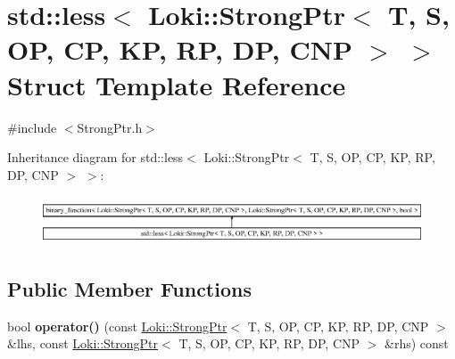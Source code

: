 \hypertarget{structstd_1_1less_3_01Loki_1_1StrongPtr_3_01T_00_01S_00_01OP_00_01CP_00_01KP_00_01RP_00_01DP_00_01CNP_01_4_01_4}{}\section{std\+:\+:less$<$ Loki\+:\+:Strong\+Ptr$<$ T, S, O\+P, C\+P, K\+P, R\+P, D\+P, C\+N\+P $>$ $>$ Struct Template Reference}
\label{structstd_1_1less_3_01Loki_1_1StrongPtr_3_01T_00_01S_00_01OP_00_01CP_00_01KP_00_01RP_00_01DP_00_01CNP_01_4_01_4}


{\ttfamily \#include $<$Strong\+Ptr.\+h$>$}

Inheritance diagram for std\+:\+:less$<$ Loki\+:\+:Strong\+Ptr$<$ T, S, O\+P, C\+P, K\+P, R\+P, D\+P, C\+N\+P $>$ $>$\+:\begin{figure}[H]
\begin{center}
\leavevmode
\includegraphics[height=1.469816cm]{structstd_1_1less_3_01Loki_1_1StrongPtr_3_01T_00_01S_00_01OP_00_01CP_00_01KP_00_01RP_00_01DP_00_01CNP_01_4_01_4}
\end{center}
\end{figure}
\subsection*{Public Member Functions}
\begin{DoxyCompactItemize}
\item 
\hypertarget{structstd_1_1less_3_01Loki_1_1StrongPtr_3_01T_00_01S_00_01OP_00_01CP_00_01KP_00_01RP_00_01DP_00_01CNP_01_4_01_4_a8f011e58043e9f936865fb3fa112e505}{}bool {\bfseries operator()} (const \hyperlink{classLoki_1_1StrongPtr}{Loki\+::\+Strong\+Ptr}$<$ T, S, O\+P, C\+P, K\+P, R\+P, D\+P, C\+N\+P $>$ \&lhs, const \hyperlink{classLoki_1_1StrongPtr}{Loki\+::\+Strong\+Ptr}$<$ T, S, O\+P, C\+P, K\+P, R\+P, D\+P, C\+N\+P $>$ \&rhs) const \label{structstd_1_1less_3_01Loki_1_1StrongPtr_3_01T_00_01S_00_01OP_00_01CP_00_01KP_00_01RP_00_01DP_00_01CNP_01_4_01_4_a8f011e58043e9f936865fb3fa112e505}

\end{DoxyCompactItemize}


